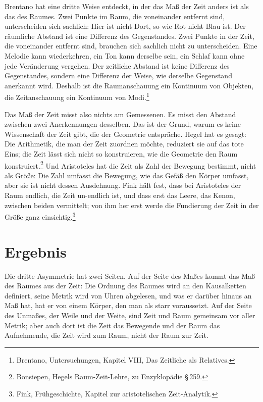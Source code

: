Brentano hat eine dritte Weise entdeckt, in der das Maß der Zeit anders ist als das des Raumes. Zwei Punkte im Raum, die voneinander entfernt sind, unterscheiden sich sachlich: Hier ist nicht Dort, so wie Rot nicht Blau ist. Der räumliche Abstand ist eine Differenz des Gegenstandes. Zwei Punkte in der Zeit, die voneinander entfernt sind, brauchen sich sachlich nicht zu unterscheiden. Eine Melodie kann wiederkehren, ein Ton kann derselbe sein, ein Schlaf kann ohne jede Veränderung vergehen. Der zeitliche Abstand ist keine Differenz des Gegenstandes, sondern eine Differenz der Weise, wie derselbe Gegenstand anerkannt wird. Deshalb ist die Raumanschauung ein Kontinuum von Objekten, die Zeitanschauung ein Kontinuum von Modi.\footnote{Brentano, Untersuchungen, Kapitel VIII, Das Zeitliche als Relatives.}

Das Maß der Zeit misst also nichts am Gemessenen. Es misst den Abstand zwischen zwei Anerkennungen desselben. Das ist der Grund, warum es keine Wissenschaft der Zeit gibt, die der Geometrie entspräche. Hegel hat es gesagt: Die Arithmetik, die man der Zeit zuordnen möchte, reduziert sie auf das tote Eins; die Zeit lässt sich nicht so konstruieren, wie die Geometrie den Raum konstruiert.\footnote{Bonsiepen, Hegels Raum-Zeit-Lehre, zu Enzyklopädie \S\,259.} Und Aristoteles hat die Zeit als Zahl der Bewegung bestimmt, nicht als Größe: Die Zahl umfasst die Bewegung, wie das Gefäß den Körper umfasst, aber sie ist nicht dessen Ausdehnung. Fink hält fest, dass bei Aristoteles der Raum endlich, die Zeit un-endlich ist, und dass erst das Leere, das Kenon, zwischen beiden vermittelt; von ihm her erst werde die Fundierung der Zeit in der Größe ganz einsichtig.\footnote{Fink, Frühgeschichte, Kapitel zur aristotelischen Zeit-Analytik.}

\section{Ergebnis}

Die dritte Asymmetrie hat zwei Seiten. Auf der Seite des Maßes kommt das Maß des Raumes aus der Zeit: Die Ordnung des Raumes wird an den Kausalketten definiert, seine Metrik wird von Uhren abgelesen, und was er darüber hinaus an Maß hat, hat er von einem Körper, den man als starr voraussetzt. Auf der Seite des Unmaßes, der Weile und der Weite, sind Zeit und Raum gemeinsam vor aller Metrik; aber auch dort ist die Zeit das Bewegende und der Raum das Aufnehmende, die Zeit wird zum Raum, nicht der Raum zur Zeit.

